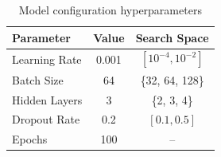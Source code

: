 \begin{table}[H]
    \centering
    \caption{Model configuration hyperparameters}
    \label{tab:hyperparams}
    \begin{tabular}{lcc}
        \toprule
        \textbf{Parameter} & \textbf{Value} & \textbf{Search Space} \\
        \midrule
        Learning Rate      & 0.001         & $[10^{-4}, 10^{-2}]$ \\
        Batch Size         & 64            & \{32, 64, 128\}     \\
        Hidden Layers      & 3             & \{2, 3, 4\}         \\
        Dropout Rate       & 0.2           & $[0.1, 0.5]$        \\
        Epochs             & 100           & --                  \\
        \bottomrule
    \end{tabular}
\end{table}
